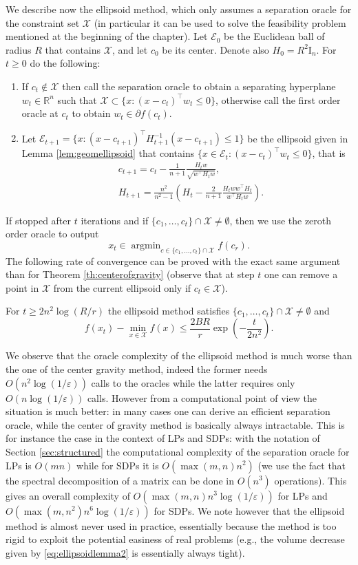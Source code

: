 \documentclass[openany]{now}
\newcommand{\mI}{\mathrm{I}}
\newcommand{\R}{\mathbb{R}}
\newcommand{\cX}{\mathcal{X}}
\newcommand{\cE}{\mathcal{E}}
\renewcommand{\epsilon}{\varepsilon}
\newcommand{\argmin}{\mathop{\mathrm{argmin}}}
\begin{document}
We describe now the ellipsoid method, which only assumes a separation oracle for the constraint set $\cX$ (in particular it can be used to solve the feasibility problem mentioned at the beginning of the chapter). 
Let $\cE_0$ be the Euclidean ball of radius $R$ that contains $\cX$, and let $c_0$ be its center. Denote also $H_0=R^2 \mI_n$. For $t \geq 0$ do the following:
\begin{enumerate}
\item If $c_t \not\in \cX$ then call the separation oracle to obtain a separating hyperplane $w_t \in \R^n$ such that $\cX \subset \{x : (x- c_t)^{\top} w_t \leq 0\}$, otherwise call the first order oracle at $c_t$ to obtain $w_t \in \partial f (c_t)$. 
\item Let $\cE_{t+1} = \{x : (x - c_{t+1})^{\top} H_{t+1}^{-1} (x-c_{t+1}) \leq 1 \}$ be the ellipsoid given in Lemma \ref{lem:geomellipsoid} that contains $\{x \in \mathcal{E}_t : (x- c_t)^{\top} w_t \leq 0\}$, that is
\begin{align*}
& c_{t+1} = c_{t} - \frac{1}{n+1} \frac{H_t w}{\sqrt{w^{\top} H_t w}} ,\\
& H_{t+1} = \frac{n^2}{n^2-1} \left(H_t - \frac{2}{n+1} \frac{H_t w w^{\top} H_t}{w^{\top} H_t w} \right) .
\end{align*}
\end{enumerate}
If stopped after $t$ iterations and if $\{c_1, \hdots, c_t\} \cap \cX \neq \emptyset$, then we use the zeroth order oracle to output
$$x_t\in \argmin_{c \in \{c_1, \hdots, c_t\} \cap \cX} f(c_r) .$$
The following rate of convergence can be proved with the exact same argument than for Theorem \ref{th:centerofgravity} (observe that at step $t$ one can remove a point in $\cX$ from the current ellipsoid only if $c_t \in \cX$).
\begin{theorem}
For $t \geq 2n^2 \log(R/r)$ the ellipsoid method satisfies $\{c_1, \hdots, c_t\} \cap \cX \neq \emptyset$ and
$$f(x_t) - \min_{x \in \mathcal{X}} f(x) \leq \frac{2 B R}{r} \exp\left( - \frac{t}{2 n^2}\right) .$$
\end{theorem}
We observe that the oracle complexity of the ellipsoid method is much worse than the one of the center gravity method, indeed the former needs $O(n^2 \log(1/\epsilon))$ calls to the oracles while the latter requires only $O(n \log(1/\epsilon))$ calls. However from a computational point of view the situation is much better: in many cases one can derive an efficient separation oracle, while the center of gravity method is basically always intractable. This is for instance the case in the context of LPs and SDPs: with the notation of Section \ref{sec:structured} the computational complexity of the separation oracle for LPs is $O(m n)$ while for SDPs it is $O(\max(m,n) n^2)$ (we use the fact that the spectral decomposition of a matrix can be done in $O(n^3)$ operations). This gives an overall complexity of $O(\max(m,n) n^3 \log(1/\epsilon))$ for LPs and $O(\max(m,n^2) n^6 \log(1/\epsilon))$ for SDPs. We note however that the ellipsoid method is almost never used in practice, essentially because the method is too rigid to exploit the potential easiness of real problems (e.g., the volume decrease given by \eqref{eq:ellipsoidlemma2} is essentially always tight).
\end{document}
